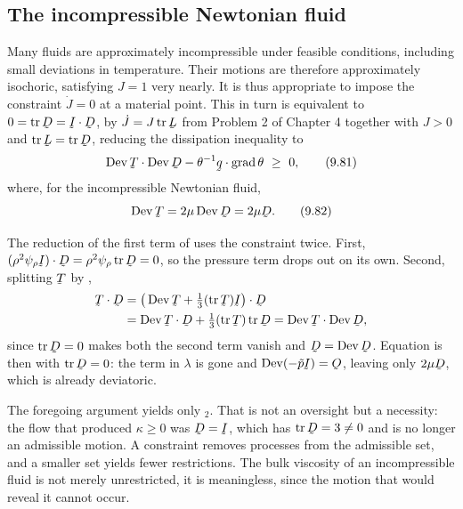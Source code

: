 \subsection*{The incompressible Newtonian fluid}

Many fluids are approximately incompressible under feasible conditions,
including small deviations in temperature. Their motions are therefore
approximately isochoric, satisfying $J=1$ very nearly. It is thus
appropriate to impose the constraint $\dot J=0$ at a material point.
This in turn is equivalent to $0=\tr\bD=\ip\I\bD$, by
$\dot J=J\tr\bL$ from Problem 2 of Chapter 4 together with $J>0$ and
$\tr\bL=\tr\bD$, reducing the dissipation inequality  to
\begin{equation}
   \ip{\Dev\bT}{\Dev\bD}-\theta^{-1}\ip\bq{\grad\theta}\ \geq\ 0 ,
   \tag{9.81}\label{eq:9.81}
\end{equation}
where, for the incompressible Newtonian fluid,
\begin{equation}
   \Dev\bT=2\mu\Dev\bD=2\mu\bD .
   \tag{9.82}\label{eq:9.82}
\end{equation}

The reduction of the first term of  uses the constraint twice.
First, $\ip{(\rho^{2}\psi_{\rho}\I)}\bD=\rho^{2}\psi_{\rho}\tr\bD=0$, so
the pressure term drops out on its own. Second, splitting $\bT$ by
,
\[
\begin{aligned}
   \ip\bT\bD&=\ip{\big(\Dev\bT+\tfrac13(\tr\bT)\I\big)}\bD\\
   &=\ip{\Dev\bT}\bD+\tfrac13(\tr\bT)\tr\bD
   =\ip{\Dev\bT}{\Dev\bD},
\end{aligned}
\]
since $\tr\bD=0$ makes both the second term vanish and $\bD=\Dev\bD$.
Equation  is then  with $\tr\bD=0$: the term in
$\lambda$ is gone and $\Dev(-\tilde p\I)=\Ob$, leaving only $2\mu\bD$,
which is already deviatoric.

The foregoing argument yields only $_{2}$. That is not an
oversight but a necessity: the flow that produced $\kappa\geq0$ was
$\bD=\I$, which has $\tr\bD=3\neq0$ and is no longer an admissible
motion. A constraint removes processes from the admissible set, and a
smaller set yields fewer restrictions. The bulk viscosity of an
incompressible fluid is not merely unrestricted, it is meaningless,
since the motion that would reveal it cannot occur.

